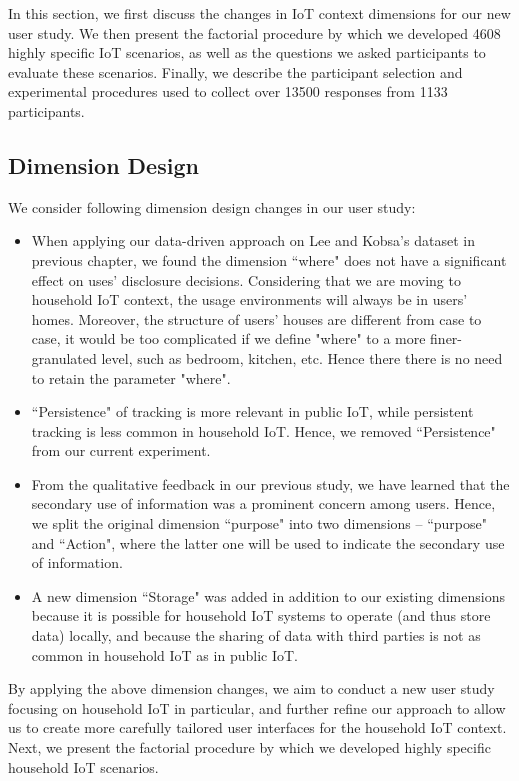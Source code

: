 In this section, we first discuss the changes in IoT context dimensions for our new user study. We then present the factorial procedure by which we developed 4608 highly specific IoT scenarios, as well as the questions we asked participants to evaluate these scenarios. Finally, we describe the participant selection and experimental procedures used to collect over 13500 responses from 1133 participants.

\subsection{Dimension Design}
We consider following dimension design changes in our user study:
\begin{itemize}
    \item When applying our data-driven approach on Lee and Kobsa's dataset in previous chapter, we found the dimension ``where" does not have a significant effect on uses' disclosure decisions. Considering that we are moving to household IoT context, the usage environments will always be in users' homes. Moreover, the structure of users' houses are different from case to case, it would be too complicated if we define "where" to a more finer-granulated level, such as bedroom, kitchen, etc.  Hence there there is no need to retain the parameter "where". 
    \item ``Persistence" of tracking is more relevant in public IoT, while persistent tracking is less common in household IoT. Hence, we removed ``Persistence" from our current experiment.
    \item From the qualitative feedback in our previous study, we have learned that the secondary use of information was a prominent concern among users. Hence, we split the original dimension ``purpose" into two dimensions -- ``purpose" and ``Action", where the latter one will be used to indicate the secondary use of information.
    \item A new dimension ``Storage" was added in addition to our existing dimensions because it is possible for household IoT systems to operate (and thus store data) locally, and because the sharing of data with third parties is not as common in household IoT as in public IoT.
\end{itemize}

By applying the above dimension changes, we aim to conduct a new user study focusing on household IoT in particular, and further refine our approach to allow us to create more carefully tailored user interfaces for the household IoT context. Next, we present the factorial procedure by which we developed highly specific household IoT scenarios.

